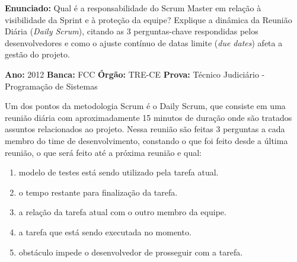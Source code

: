 \documentclass[12pt]{article}
\begin{document}
\vspace{0.15cm}
\noindent\textbf{Enunciado:} Qual é a responsabilidade do Scrum Master em relação à visibilidade da Sprint e à proteção da equipe? Explique a dinâmica da Reunião Diária (\textit{Daily Scrum}), citando as 3 perguntas-chave respondidas pelos desenvolvedores e como o ajuste contínuo de datas limite (\textit{due dates}) afeta a gestão do projeto.

\vspace{0.2cm}
\begin{caixaResposta}
\end{caixaResposta}

\vspace{0.6cm}

\vspace{0.15cm}

\begin{metaConcurso}
\small \textbf{Ano:} 2012 \qquad \textbf{Banca:} FCC \qquad \textbf{Órgão:} TRE-CE \qquad \textbf{Prova:} Técnico Judiciário - Programação de Sistemas
\end{metaConcurso}

\vspace{0.15cm}
\noindent Um dos pontos da metodologia Scrum é o Daily Scrum, que consiste em uma reunião diária com aproximadamente 15 minutos de duração onde são tratados assuntos relacionados ao projeto. Nessa reunião são feitas 3 perguntas a cada membro do time de desenvolvimento, constando o que foi feito desde a última reunião, o que será feito até a próxima reunião e qual:

\begin{enumerate}[label=\Alph*)]
    \item modelo de testes está sendo utilizado pela tarefa atual.
    \item o tempo restante para finalização da tarefa.
    \item a relação da tarefa atual com o outro membro da equipe.
    \item a tarefa que está sendo executada no momento.
    \item obstáculo impede o desenvolvedor de prosseguir com a tarefa.
\end{enumerate}

\vspace{0.6cm}
\end{document}
